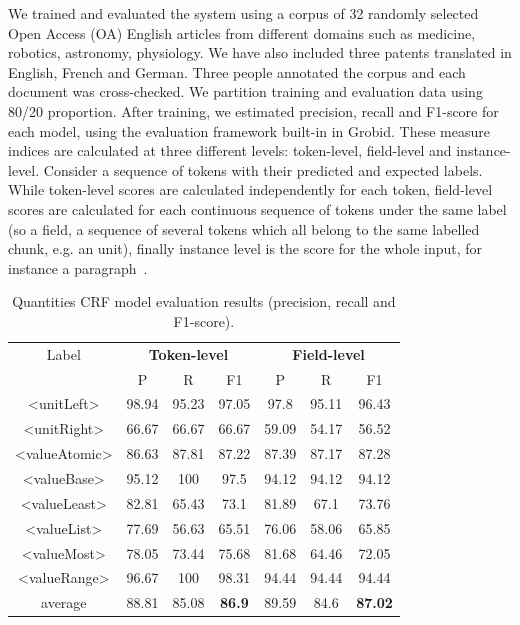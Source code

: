 \documentclass[sigplan, anonymous, review]{acmart}
\begin{document}
We trained and evaluated the system using a corpus of 32 randomly selected Open Access (OA) English articles from different domains such as medicine, robotics, astronomy, physiology. We have also included three patents translated in English, French and German. Three people annotated the corpus and each document was cross-checked. We partition training and evaluation data using 80/20 proportion. After training, we estimated precision, recall and F1-score for each model, using the evaluation framework built-in in Grobid. These measure indices are calculated at three different levels: token-level, field-level and instance-level. Consider a sequence of tokens with their predicted and expected labels. While token-level scores are calculated independently for each token, field-level scores are calculated for each continuous sequence of tokens under the same label (so a field, a sequence of several tokens which all belong to the same labelled chunk, e.g. an unit), finally instance level is the score for the whole input, for instance a paragraph~\cite{foppiano2019proposal}. 

\begin{table}[ht]
   \caption{Quantities CRF model evaluation results (precision, recall and F1-score).}
   \label{tab:quantities-evaluation}
   \begin{tabular}{c|ccc|ccc}
       \toprule
       Label & \multicolumn{3}{c}{\textbf{Token-level}} & \multicolumn{3}{c}{\textbf{Field-level}}\\
        & P & R & F1 & P & R & F1 \\
       \midrule
       <unitLeft>    & 98.94 & 95.23 & 97.05 & 97.8  & 95.11 & 96.43\\
       <unitRight>   & 66.67 & 66.67 & 66.67 & 59.09 & 54.17 & 56.52\\
       <valueAtomic> & 86.63 & 87.81 & 87.22 & 87.39 & 87.17 & 87.28\\
       <valueBase>   & 95.12 & 100   & 97.5  & 94.12 & 94.12 & 94.12\\
       <valueLeast>  & 82.81 & 65.43 & 73.1  & 81.89 & 67.1  & 73.76\\
       <valueList>   & 77.69 & 56.63 & 65.51 & 76.06 & 58.06 & 65.85\\
       <valueMost>   & 78.05 & 73.44 & 75.68 & 81.68 & 64.46 & 72.05\\
       <valueRange>  & 96.67 & 100   & 98.31 & 94.44 & 94.44 & 94.44\\
       \midrule
       average       & 88.81  & 85.08 & \textbf{86.9} & 89.59 & 84.6 & \textbf{87.02}\\
       \bottomrule
   \end{tabular}
\end{table}
\end{document}
